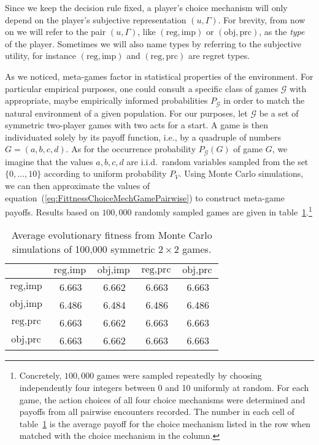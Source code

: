 \documentclass[fleqn,reqno,12pt]{article}
\theoremstyle{Satz}
\theoremstyle{Bsp}
\begin{document}
Since we keep the decision rule fixed, a player's choice mechanism will only depend on the player's subjective representation $ (u,\Gamma) $. For brevity, from now on we will refer to the pair $ (u,\Gamma)$, like $(\text{reg}, \text{imp})$ or $(\text{obj}, \text{prc})$, as the \textit{type} of the player. Sometimes we will also name types by referring to the subjective utility, for instance $(\text{reg}, \text{imp})$ and $(\text{reg}, \text{prc})$ are regret types.

As we noticed, meta-games factor in statistical properties of the environment. For particular
empirical purposes, one could consult a specific class of games $\mathcal{G}$ with appropriate,
maybe empirically informed probabilities $P_{\mathcal{G}}$ in order to match the natural
environment of a given population. For our purposes, let $\mathcal{G}$ be a set of symmetric
two-player games with two acts for a start. A game is then individuated solely by its payoff
function, i.e., by a quadruple of numbers $G=(a,b,c,d)$. As for the occurrence probability
$P_{\mathcal{G}}(G)$ of game $G$, we imagine that the values $a,b,c,d$ are i.i.d.~random
variables sampled from the set $ \lbrace 0, \dots, 10 \rbrace$ according to uniform probability
$P_{V}$. Using Monte Carlo simulations, we can then approximate the values of
equation~(\ref{eq:FittnessChoiceMechGamePairwise}) to construct meta-game payoffs. Results
based on $100,000$ randomly sampled games are given in
table~\ref{tab:ExpectedFitness_4Types}.\footnote{Concretely, $100,000$ games were sampled
  repeatedly by choosing independently four integers between 0 and 10 uniformly at random. For
  each game, the action choices of all four choice mechanisms were determined and payoffs from
  all pairwise encounters recorded. The number in each cell of
  table~\ref{tab:ExpectedFitness_4Types} is the average payoff for the choice mechanism listed
  in the row when matched with the choice mechanism in the column.}

\begin{table}[t]
\centering
\begin{tabular}{ccccc}
  \toprule
 & $\text{reg}, \text{imp}$ 
 & $\text{obj}, \text{imp}$ 
 & $\text{reg}, \text{prc}$ 
 & $\text{obj}, \text{prc}$ \\ 
  \midrule
  $\text{reg}, \text{imp}$ & 6.663 & 6.662 & 6.663 & 6.663 \\ 
  $\text{obj}, \text{imp}$ & 6.486 & 6.484 & 6.486 & 6.486 \\ 
  $\text{reg}, \text{prc}$ & 6.663 & 6.662 & 6.663 & 6.663 \\  
  $\text{obj}, \text{prc}$ & 6.663 & 6.662 & 6.663 & 6.663 \\ 
   \bottomrule
\end{tabular}                    
\caption{Average evolutionary fitness from Monte Carlo simulations of 100,000 symmetric $2 \times 2$ games.}
\label{tab:ExpectedFitness_4Types}
\end{table}
\end{document}
